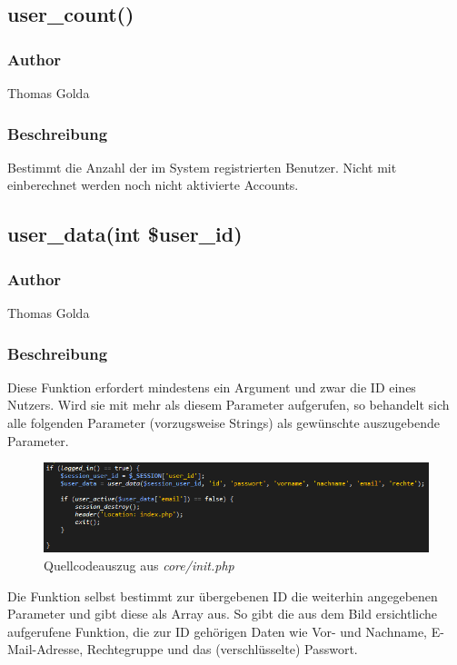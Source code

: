 \documentclass[fontsize = 12pt, paper = a4]{scrreprt}
\begin{document}
\subsection*{user\_count()}
\subsubsection*{Author}
Thomas Golda
\subsubsection*{Beschreibung}
Bestimmt die Anzahl der im System registrierten Benutzer. Nicht mit einberechnet werden noch nicht aktivierte Accounts.

\newpage

\subsection*{user\_data(int \$user\_id)}
\subsubsection*{Author}
Thomas Golda
\subsubsection*{Beschreibung}
Diese Funktion erfordert mindestens ein Argument und zwar die ID eines Nutzers. Wird sie mit mehr als diesem Parameter aufgerufen, so 
behandelt sich alle folgenden Parameter (vorzugsweise Strings) als gewünschte auszugebende Parameter.

\begin{figure}[h]
\centering
\includegraphics[scale = 0.78]{userdata.png}
\caption[user\_data() Funktion]{Quellcodeauszug aus \textit{core/init.php}}
\label{Quellcodeauszug aus core/init.php}
\end{figure}

Die Funktion selbst bestimmt zur übergebenen ID die weiterhin angegebenen Parameter und gibt diese als Array aus. So gibt die aus dem Bild ersichtliche aufgerufene Funktion, die zur ID gehörigen Daten wie Vor- und Nachname, E-Mail-Adresse, Rechtegruppe und das (verschlüsselte) Passwort.
\end{document}
